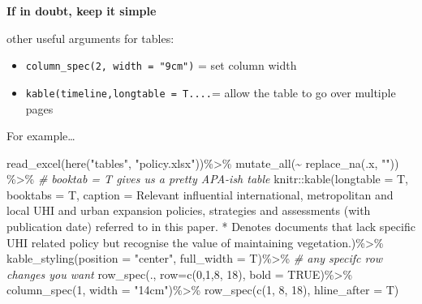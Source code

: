 \documentclass[
  12pt,
  oneside]{book}
\newenvironment{Shaded}{\begin{snugshade}}{\end{snugshade}}
\newcommand{\AttributeTok}[1]{\textcolor[rgb]{0.77,0.63,0.00}{#1}}
\newcommand{\CommentTok}[1]{\textcolor[rgb]{0.56,0.35,0.01}{\textit{#1}}}
\newcommand{\ConstantTok}[1]{\textcolor[rgb]{0.00,0.00,0.00}{#1}}
\newcommand{\DecValTok}[1]{\textcolor[rgb]{0.00,0.00,0.81}{#1}}
\newcommand{\FunctionTok}[1]{\textcolor[rgb]{0.00,0.00,0.00}{#1}}
\newcommand{\NormalTok}[1]{#1}
\newcommand{\SpecialCharTok}[1]{\textcolor[rgb]{0.00,0.00,0.00}{#1}}
\newcommand{\StringTok}[1]{\textcolor[rgb]{0.31,0.60,0.02}{#1}}
\begin{document}
\textbf{If in doubt, keep it simple}

other useful arguments for tables:

\begin{itemize}
\item
  \texttt{column\_spec(2,\ width\ =\ "9cm")} = set column width
\item
  \texttt{kable(timeline,longtable\ =\ T....}= allow the table to go over multiple pages
\end{itemize}

For example\ldots{}
\newpage

\begin{Shaded}
\begin{Highlighting}[]
\FunctionTok{read\_excel}\NormalTok{(}\FunctionTok{here}\NormalTok{(}\StringTok{"tables"}\NormalTok{, }\StringTok{"policy.xlsx"}\NormalTok{))}\SpecialCharTok{\%\textgreater{}\%}
  \FunctionTok{mutate\_all}\NormalTok{(}\SpecialCharTok{\textasciitilde{}} \FunctionTok{replace\_na}\NormalTok{(.x, }\StringTok{""}\NormalTok{)) }\SpecialCharTok{\%\textgreater{}\%}
  \CommentTok{\# booktab = T gives us a pretty APA{-}ish table}
\NormalTok{  knitr}\SpecialCharTok{::}\FunctionTok{kable}\NormalTok{(}\AttributeTok{longtable =}\NormalTok{ T, }\AttributeTok{booktabs =}\NormalTok{ T, }
               \AttributeTok{caption =} \StringTok{\textquotesingle{}Relevant influential international, metropolitan and local UHI and urban expansion policies, strategies and assessments (with publication date) referred to in this paper. * Denotes documents that lack specific UHI related policy but recognise the value of maintaining vegetation.\textquotesingle{}}\NormalTok{)}\SpecialCharTok{\%\textgreater{}\%} 
  \FunctionTok{kable\_styling}\NormalTok{(}\AttributeTok{position =} \StringTok{"center"}\NormalTok{, }\AttributeTok{full\_width =}\NormalTok{ T)}\SpecialCharTok{\%\textgreater{}\%}
  \CommentTok{\# any specifc row changes you want}
    \FunctionTok{row\_spec}\NormalTok{(.,}
  \AttributeTok{row=}\FunctionTok{c}\NormalTok{(}\DecValTok{0}\NormalTok{,}\DecValTok{1}\NormalTok{,}\DecValTok{8}\NormalTok{, }\DecValTok{18}\NormalTok{),}
  \AttributeTok{bold =} \ConstantTok{TRUE}\NormalTok{)}\SpecialCharTok{\%\textgreater{}\%}
  \FunctionTok{column\_spec}\NormalTok{(}\DecValTok{1}\NormalTok{, }\AttributeTok{width =} \StringTok{"14cm"}\NormalTok{)}\SpecialCharTok{\%\textgreater{}\%}
  \FunctionTok{row\_spec}\NormalTok{(}\FunctionTok{c}\NormalTok{(}\DecValTok{1}\NormalTok{, }\DecValTok{8}\NormalTok{, }\DecValTok{18}\NormalTok{), }\AttributeTok{hline\_after =}\NormalTok{ T)}
\end{Highlighting}
\end{Shaded}
\end{document}
